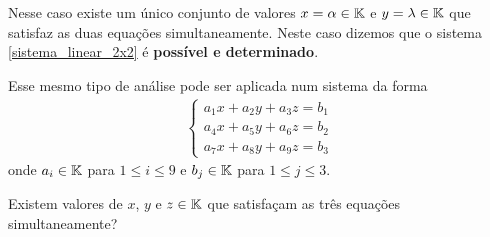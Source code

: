 \documentclass{beamer}
\begin{document}
    \begin{frame}
        \begin{center}
        \end{center}
        
        Nesse caso existe um único conjunto de valores $x = \alpha \in \mathbb{K}$ e $y = \lambda \in \mathbb{K}$ que satisfaz as duas equações simultaneamente. Neste caso dizemos que o sistema \eqref{sistema_linear_2x2} é \textbf{possível e determinado}.
    \end{frame}

    \begin{frame}
        Esse mesmo tipo de análise pode ser aplicada num sistema da forma
        \begin{align}
            \begin{cases}\label{sistema_linear_3x3}
                a_1x + a_2y + a_3z = b_1\\
                a_4x + a_5y + a_6z = b_2\\
                a_7x + a_8y + a_9z = b_3
            \end{cases}
        \end{align}
        onde $a_i \in \mathbb{K}$ para $1 \le i \le 9$ e $b_j \in \mathbb{K}$ para $1 \le j \le 3$.

        \vspace{.3cm}

        Existem valores de $x$, $y$ e $z \in \mathbb{K}$ que satisfaçam as três equações simultaneamente?
    \end{frame}
    
\end{document}

